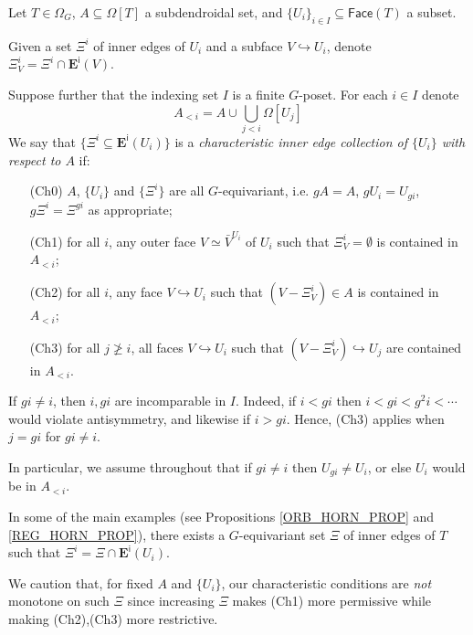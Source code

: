 \documentclass[a4paper,10pt
 ,draft
]{article}%
\begin{document}
\begin{definition}\label{CHAREDGE DEF}
	Let $T \in \Omega_G$, $A \subseteq \Omega[T]$ a subdendroidal set, and $\{U_i\}_{i \in I} \subseteq \mathsf{Face}(T)$ a subset.

	Given a set $\Xi^i$ of inner edges of $U_i$ and a subface $V \hookrightarrow U_i$, denote $\Xi_V^i = \Xi^i \cap \boldsymbol{E}^{\mathsf{i}}(V)$.

	Suppose further that the indexing set $I$ is a 
	finite $G$-poset. For each $i \in I$ denote
\[
	A_{<i} = A \cup \bigcup_{j<i} \Omega[U_j]
\]
	We say that $\{\Xi^i \subseteq \boldsymbol{E}^{\mathsf{i}}(U_i)\}$
	is a \textit{characteristic inner edge collection of $\{U_i\}$ with respect to $A$} if:
	\begin{itemize}
	\item[(Ch0)] $A$, $\{U_i\}$ and $\{\Xi^i\}$ are all $G$-equivariant, i.e. $g A = A$, $g U_i = U_{gi}$, $g \Xi^i = \Xi^{gi}$ as appropriate; 
	\item[(Ch1)] for all $i$, any outer face $V \simeq \bar{V}^{U_i}$
		of $U_i$ such that $\Xi_{V}^i = \emptyset$
		is contained in $A_{<i}$;
	\item[(Ch2)] for all $i$, any face
		$V \hookrightarrow U_i$ such that $(V-\Xi_V^i) \in A$
		is contained in $A_{<i}$;
	\item[(Ch3)] for all $j \not \geq i$, 
		all faces $V \hookrightarrow U_i$ such that 
		$(V-\Xi^i_V) \hookrightarrow U_j$
		are contained in $A_{<i}$.
	\end{itemize}
\end{definition}


\begin{remark}\label{XIIII REM}
If $g i \neq i$, then $i,g i$ are incomparable in $I$. Indeed, if $i<gi$ then $i<gi<g^2i<\cdots$ would violate antisymmetry, and likewise if $i>gi$.
Hence, (Ch3) applies when $j=gi$ for $gi\neq i$.

In particular, we assume throughout that if
$gi \neq i$ then $U_{gi} \neq U_i$,
or else $U_i$ would be in $A_{<i}$.
\end{remark}


\begin{remark}\label{SOMEMAIN REM}
In some of the main examples (see Propositions \ref{ORB_HORN_PROP} and \ref{REG_HORN_PROP}), there exists a $G$-equivariant set 
$\Xi$ of inner edges of $T$ such that $\Xi^i = \Xi \cap \boldsymbol{E}^{\mathsf{i}}(U_i)$.
	
We caution that, for fixed $A$ and $\{U_i\}$, our characteristic conditions are \textit{not} monotone on such $\Xi$ since increasing $\Xi$ makes (Ch1) more permissive while making (Ch2),(Ch3) more restrictive.
\end{remark}
\end{document}
